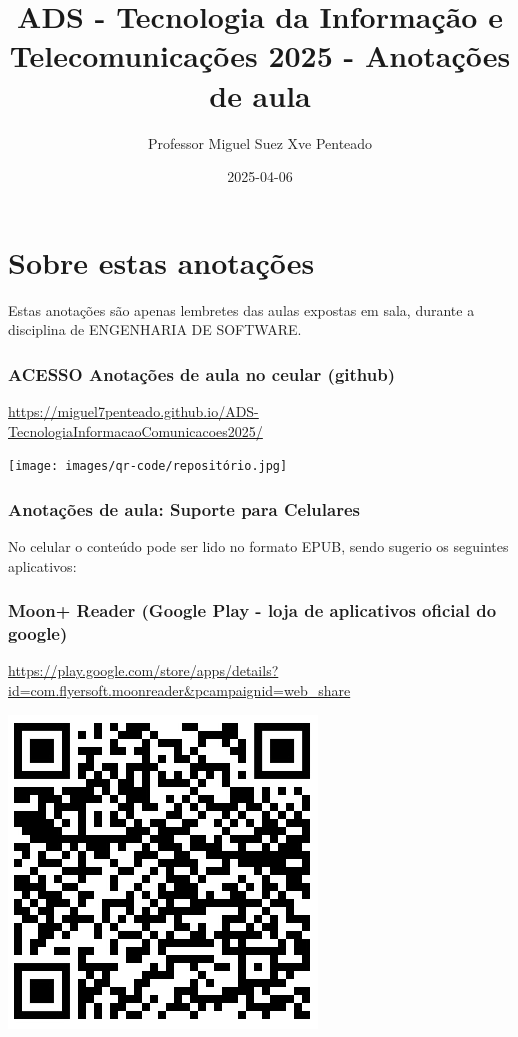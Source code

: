 \documentclass[
]{book}
\title{ADS - Tecnologia da Informação e Telecomunicações 2025 - Anotações de aula}
\author{Professor Miguel Suez Xve Penteado}
\date{2025-04-06}
\begin{document}
\maketitle

{
\setcounter{tocdepth}{1}
\tableofcontents
}
\chapter*{Sobre estas anotações}\label{sobre-estas-anotauxe7uxf5es}

Estas anotações são apenas lembretes das aulas expostas em sala, durante a disciplina de ENGENHARIA DE SOFTWARE.

\subsection{ACESSO Anotações de aula no ceular (github)}\label{acesso-anotauxe7uxf5es-de-aula-no-ceular-github}

\url{https://miguel7penteado.github.io/ADS-TecnologiaInformacaoComunicacoes2025/}

\texttt{[image: images/qr-code/repositório.jpg]}

\subsection{Anotações de aula: Suporte para Celulares}\label{anotauxe7uxf5es-de-aula-suporte-para-celulares}

No celular o conteúdo pode ser lido no formato EPUB, sendo sugerio os seguintes aplicativos:

\subsection{\texorpdfstring{\textbf{Moon+ Reader (Google Play - loja de aplicativos oficial do google)}}{Moon+ Reader (Google Play - loja de aplicativos oficial do google)}}\label{moon-reader-google-play---loja-de-aplicativos-oficial-do-google}

\url{https://play.google.com/store/apps/details?id=com.flyersoft.moonreader&pcampaignid=web_share}

\includegraphics{images/qr-code/leitor_ebook/MoonReaderPlus.jpg}
\end{document}
